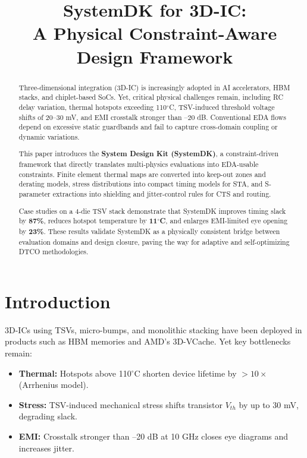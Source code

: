 \documentclass[conference]{IEEEtran}
\begin{document}
\title{SystemDK for 3D-IC:\\
A Physical Constraint-Aware Design Framework}

\author{
}

\maketitle

\begin{abstract}
Three-dimensional integration (3D-IC) is increasingly adopted in AI accelerators, HBM stacks, and chiplet-based SoCs. Yet, critical physical challenges remain, including RC delay variation, thermal hotspots exceeding 110$^\circ$C, TSV-induced threshold voltage shifts of 20--30 mV, and EMI crosstalk stronger than --20 dB. Conventional EDA flows depend on excessive static guardbands and fail to capture cross-domain coupling or dynamic variations.

This paper introduces the \textbf{System Design Kit (SystemDK)}, a constraint-driven framework that directly translates multi-physics evaluations into EDA-usable constraints. Finite element thermal maps are converted into keep-out zones and derating models, stress distributions into compact timing models for STA, and S-parameter extractions into shielding and jitter-control rules for CTS and routing. 

Case studies on a 4-die TSV stack demonstrate that SystemDK improves timing slack by \textbf{87\%}, reduces hotspot temperature by \textbf{11$^\circ$C}, and enlarges EMI-limited eye opening by \textbf{23\%}. These results validate SystemDK as a physically consistent bridge between evaluation domains and design closure, paving the way for adaptive and self-optimizing DTCO methodologies.
\end{abstract}

\section{Introduction}
3D-ICs using TSVs, micro-bumps, and monolithic stacking have been deployed in products such as HBM memories and AMD’s 3D-VCache. Yet key bottlenecks remain:
\begin{itemize}
  \item \textbf{Thermal:} Hotspots above 110$^\circ$C shorten device lifetime by $>10\times$ (Arrhenius model).
  \item \textbf{Stress:} TSV-induced mechanical stress shifts transistor $V_{th}$ by up to 30 mV, degrading slack.
  \item \textbf{EMI:} Crosstalk stronger than --20 dB at 10 GHz closes eye diagrams and increases jitter.
\end{itemize}
\end{document}
